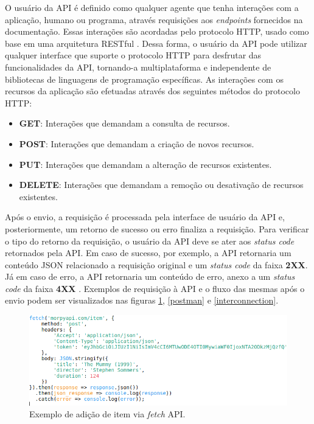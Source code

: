 \documentclass[12pt, openright, oneside, a4paper, brazil]{abntex2}
\begin{document}
O usuário da API é definido como qualquer agente que tenha interações com a aplicação, humano ou programa, através requisições aos \textit{endpoints} fornecidos na documentação. Essas interações são acordadas pelo protocolo HTTP, usado como base em uma arquitetura RESTful \cite{rodriguez2008restful}. Dessa forma, o usuário da API pode utilizar qualquer interface que suporte o protocolo HTTP para desfrutar das funcionalidades da API, tornando-a multiplataforma e independente de bibliotecas de linguagens de programação específicas. As interações com os recursos da aplicação são efetuadas através dos seguintes métodos do protocolo HTTP:

\begin{itemize}
	\item \textbf{GET}: Interações que demandam a consulta de recursos.

	\item \textbf{POST}: Interações que demandam a criação de novos recursos.

	\item \textbf{PUT}: Interações que demandam a alteração de recursos existentes.

	\item \textbf{DELETE}: Interações que demandam a remoção ou desativação de recursos existentes.
\end{itemize}

Após o envio, a requisição é processada pela interface de usuário da API e, posteriormente, um retorno de sucesso ou erro finaliza a requisição. Para verificar o tipo do retorno da requisição, o usuário da API deve se ater aos \textit{status code} retornados pela API. Em caso de sucesso, por exemplo, a API retornaria um conteúdo JSON relacionado a requisição original e um \textit{status code} da faixa \textbf{2XX}. Já em caso de erro, a API retornaria um conteúdo de erro, anexo a um \textit{status code} da faixa \textbf{4XX} \cite{fielding1999hypertext}. Exemplos de requisição à API e o fluxo das mesmas após o envio podem ser visualizados nas figuras \ref{fetch_api}, \ref{postman} e \ref{interconnection}.

\begin{figure}[htp]
	\caption{\label{fetch_api}Exemplo de adição de item via \textit{fetch} API.}
	\begin{center}
		\includegraphics[scale=0.8]{images/fetch_api.png}
	\end{center}
	\hspace{5.5cm}{Fonte: O Autor.}
\end{figure}
\end{document}
